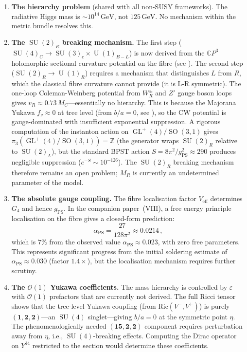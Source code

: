 \documentclass[12pt,a4paper]{article}
\theoremstyle{definition}
\newcommand{\GL}{\operatorname{GL}}
\newcommand{\SO}{\operatorname{SO}}
\newcommand{\SU}{\operatorname{SU}}
\newcommand{\U}{\operatorname{U}}
\newcommand{\CP}{\mathbb{C}P}
\newcommand{\gPS}{g_{\mathrm{PS}}}
\newcommand{\aPS}{\alpha_{\mathrm{PS}}}
\begin{document}
\begin{enumerate}
\item \textbf{The hierarchy problem} (shared with all non-SUSY frameworks).
The radiative Higgs mass is $\sim 10^{14}\,\mathrm{GeV}$, not $125\,\mathrm{GeV}$.
No mechanism within the metric bundle resolves this.

\item \textbf{The $\SU(2)_R$ breaking mechanism.}
The first step ($\SU(4)_C \to \SU(3)_c \times \U(1)_{B-L}$) is now derived from the $\CP^3$ holomorphic sectional curvature potential on the fibre (see ).
The second step ($\SU(2)_R \to \U(1)_R$) requires a mechanism that distinguishes $L$ from $R$, which the classical fibre curvature cannot provide (it is L-R symmetric).
The one-loop Coleman-Weinberg potential from $W_R^\pm$ and $Z'$ gauge boson loops gives $v_R \approx 0.73\, M_C$---essentially no hierarchy.
This is because the Majorana Yukawa $f_\nu \approx 0$ at tree level (from $b/a = 0$, see ), so the CW potential is gauge-dominated with insufficient exponential suppression.
A rigorous computation of the instanton action on $\GL^+(4)/\SO(3,1)$ gives $\pi_3(\GL^+(4)/\SO(3,1)) = \mathbb{Z}$ (the generator wraps $\SU(2)_R$ relative to $\SU(2)_L$), but the standard BPST action $S = 8\pi^2/g_{\mathrm{PS}}^2 \approx 290$ produces negligible suppression ($e^{-S} \sim 10^{-126}$).
The $\SU(2)_R$ breaking mechanism therefore remains an open problem; $M_R$ is currently an undetermined parameter of the model.

\item \textbf{The absolute gauge coupling.}
The fibre localisation factor $V_{\mathrm{eff}}$ determines $G_4$ and hence $\gPS$.
In the companion paper~(VIII), a free energy principle localisation on the fibre gives a closed-form prediction:
\begin{equation}
\aPS = \frac{27}{128\pi^2} \approx 0.0214\,,
\end{equation}
which is $7\%$ from the observed value $\aPS \approx 0.023$, with zero free parameters.
This represents significant progress from the initial soldering estimate of $\aPS \approx 0.030$ (factor $1.4\times$), but the localisation mechanism requires further scrutiny.

\item \textbf{The $\mathcal{O}(1)$ Yukawa coefficients.}
The mass hierarchy is controlled by $\varepsilon$ with $\mathcal{O}(1)$ prefactors that are currently not derived.
The full Ricci tensor shows that the tree-level Yukawa coupling (from $\mathrm{Ric}(V^-, V^+)$) is purely $(\mathbf{1},\mathbf{2},\mathbf{2})$---an $\SU(4)$ singlet---giving $b/a = 0$ at the symmetric point $\eta$.
The phenomenologically needed $(\mathbf{15},\mathbf{2},\mathbf{2})$ component requires perturbation away from $\eta$, i.e., $\SU(4)$-breaking effects.
Computing the Dirac operator on $Y^{14}$ restricted to the section would determine these coefficients.


\end{enumerate}
\end{document}
